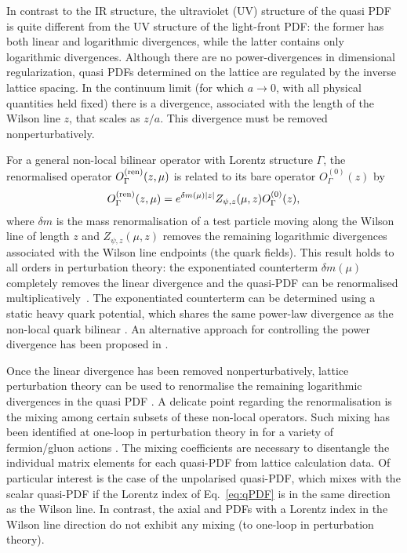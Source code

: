 \begin{itemize}
In contrast to the IR structure, the ultraviolet (UV) structure of the quasi PDF is quite different from the UV structure of the light-front PDF: the former has both linear and logarithmic divergences, while the latter contains only logarithmic divergences. Although there are no power-divergences in dimensional regularization, quasi PDFs determined on the lattice are regulated by the inverse lattice spacing. In the continuum limit (for which $a\to 0$, with all physical quantities held fixed) there is a divergence, associated with the length of the Wilson line $z$, that scales as $z/a$. This divergence must be removed nonperturbatively.

For a general non-local bilinear operator with Lorentz structure $\Gamma$, the renormalised operator $O_{\Gamma}^{\rm (ren)}(z,\mu)$ is
related to its bare operator $O^{(0)}_{\Gamma}(z)$ by \cite{Dotsenko:1979wb, Arefeva:1980zd, Craigie:1980qs,Dorn:1986dt}
\begin{eqnarray}\label{eq:renorm_non-local}
O_{\Gamma}^{\rm (ren)}(z,\mu)=e^{\delta m(\mu)|z|}Z_{\psi, z}(\mu,z)O^{(0)}_{\Gamma}(z),
\end{eqnarray}
where $\delta m$ is the mass renormalisation of a test particle moving along the Wilson line of length $z$ and $Z_{\psi, z}(\mu,z)$ removes the remaining logarithmic divergences associated with the Wilson line endpoints (the quark fields). This result holds to all orders in perturbation theory: the exponentiated counterterm $\delta m(\mu)$ completely removes the linear divergence and the quasi-PDF can be renormalised multiplicatively~\cite{Ji:2015jwa,Ji:2017oey}. The exponentiated counterterm can be determined using a static heavy quark potential, which shares the same power-law divergence as the non-local quark bilinear \cite{Musch:2010ka,Ishikawa:2016znu, Chen:2016fxx}. An alternative approach for controlling the power divergence has been proposed in \cite{Monahan:2016bvm}.

Once the linear divergence has been removed nonperturbatively, lattice perturbation theory can be used to renormalise the remaining logarithmic divergences in the quasi PDF \cite{Ishikawa:2016znu,Chen:2016fxx,Carlson:2017gpk,Xiong:2017jtn}. A delicate point regarding the renormalisation is the mixing among certain subsets of these non-local operators. Such mixing has been identified at one-loop in perturbation theory in \cite{Constantiou:2017soon} for a variety of fermion/gluon actions . The mixing coefficients are necessary to disentangle the individual matrix elements for each quasi-PDF from lattice calculation data. Of particular interest is the case of the unpolarised quasi-PDF, which mixes with the scalar quasi-PDF if the Lorentz index of Eq.~\eqref{eq:qPDF} is in the same direction as the Wilson line. In contrast, the axial and  PDFs with a Lorentz index in the Wilson line direction do not exhibit any mixing (to one-loop in perturbation theory). 


\end{itemize}
